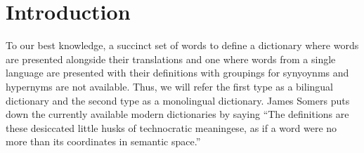 
\chapter{Introduction}\label{chap:introduction}%

To our best knowledge, a succinct set of words to define a dictionary where words are presented alongside their translations and one where words from a single language are presented with their definitions with groupings for synyoynms and hypernyms are not available.
Thus, we will refer the first type as a bilingual dictionary and the second type as a monolingual dictionary.
James Somers puts down the currently available modern dictionaries by saying \enquote{The definitions are these desiccated little husks of technocratic meaningese, as if a word were no more than its coordinates in semantic space.}\cite{noauthor_youre_nodate}

